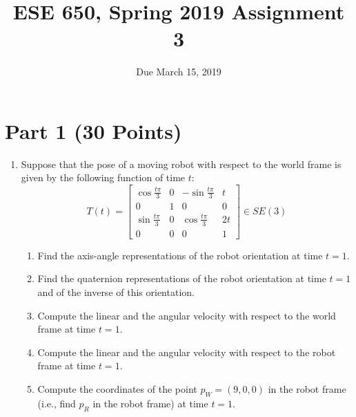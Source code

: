 \documentclass{article}
\title{ESE 650, Spring 2019 Assignment 3}
\date{Due March 15, 2019}
\begin{document}
\maketitle

\section{Part 1 (30 Points)}

 
\begin{enumerate} 
  \item   Suppose that the pose of a moving robot with respect to the world frame is given by the following function of time $t$:
  \[
  T(t) = \begin{bmatrix}
    \cos\frac{t\pi}{3}  & 0 & -\sin\frac{t\pi}{3} & t\\
    0  &  1 &  0 &0\\
    \sin\frac{t\pi}{3} &  0 & \cos\frac{t\pi}{3} & 2t\\
    0 & 0 & 0 & 1
  \end{bmatrix} \in SE(3)
  \]
    \begin{enumerate}
      \item Find the axis-angle representations of the robot orientation at time $t=1$.
      \item Find the quaternion representations of the robot orientation at time $t=1$ and of the inverse of this orientation.
      \item Compute the linear and the angular velocity with respect to the world frame at time $t = 1$.
      \item Compute the linear and the angular velocity with respect to the robot frame at time $t = 1$.
      \item Compute the coordinates of the point $p_W = (9, 0, 0)$ in the robot frame (i.e., find $p_R$ in the robot frame) at time $t = 1$.
    \end{enumerate}


\end{enumerate}
\end{document}
